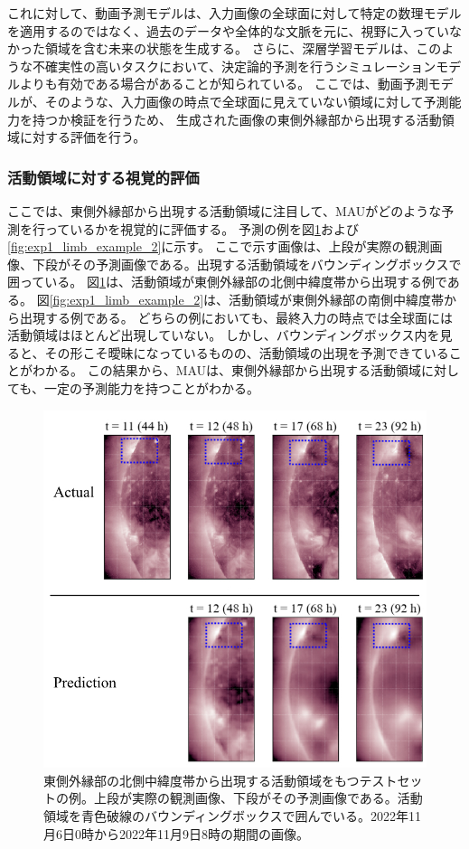       これに対して、動画予測モデルは、入力画像の全球面に対して特定の数理モデルを適用するのではなく、過去のデータや全体的な文脈を元に、視野に入っていなかった領域を含む未来の状態を生成する。
      さらに、深層学習モデルは、このような不確実性の高いタスクにおいて、決定論的予測を行うシミュレーションモデルよりも有効である場合があることが知られている。
      ここでは、動画予測モデルが、そのような、入力画像の時点で全球面に見えていない領域に対して予測能力を持つか検証を行うため、 生成された画像の東側外縁部から出現する活動領域に対する評価を行う。

      \subsubsection{活動領域に対する視覚的評価}
        ここでは、東側外縁部から出現する活動領域に注目して、MAUがどのような予測を行っているかを視覚的に評価する。
        予測の例を図\ref{fig:exp1_limb_example_1}および\ref{fig:exp1_limb_example_2}に示す。
        ここで示す画像は、上段が実際の観測画像、下段がその予測画像である。出現する活動領域をバウンディングボックスで囲っている。
        図\ref{fig:exp1_limb_example_1}は、活動領域が東側外縁部の北側中緯度帯から出現する例である。
        図\ref{fig:exp1_limb_example_2}は、活動領域が東側外縁部の南側中緯度帯から出現する例である。
        どちらの例においても、最終入力の時点では全球面には活動領域はほとんど出現していない。
        しかし、バウンディングボックス内を見ると、その形こそ曖昧になっているものの、活動領域の出現を予測できていることがわかる。
        この結果から、MAUは、東側外縁部から出現する活動領域に対しても、一定の予測能力を持つことがわかる。
        \begin{figure}[htbp]
          \centering
          \includegraphics[width=\textwidth]{figures/exp1/limb_sample_3_caption.jpg}
          \caption{東側外縁部の北側中緯度帯から出現する活動領域をもつテストセットの例。上段が実際の観測画像、下段がその予測画像である。活動領域を青色破線のバウンディングボックスで囲んでいる。2022年11月6日0時から2022年11月9日8時の期間の画像。}
          \label{fig:exp1_limb_example_1}
        \end{figure}
